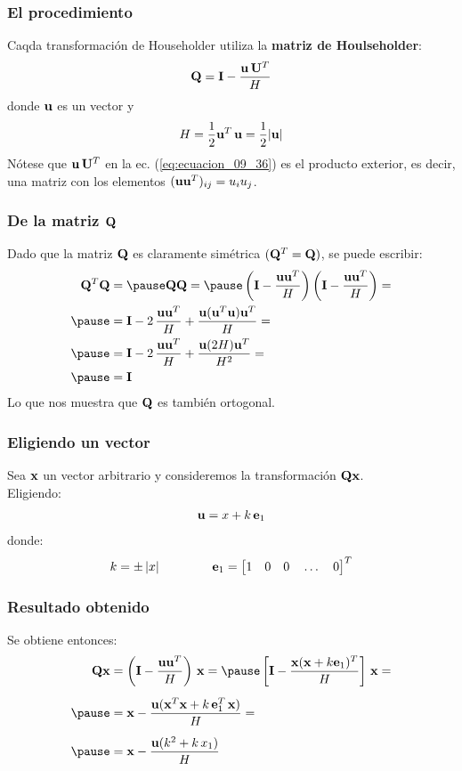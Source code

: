 \documentclass[12pt]{beamer}
\begin{document}
\begin{frame}
\frametitle{El procedimiento}
Caqda transformación de Householder utiliza la \textbf{\textcolor{drab}{matriz de Houlseholder}}:
\pause
\begin{align}
\vb{Q} = \vb{I} - \dfrac{\vb{u} \, \vb{U}^{T}}{H}
\label{eq:ecuacion_09_36}
\end{align}
\pause
donde 
$\vb{u}$ es un vector y 
\begin{align}
H = \dfrac{1}{2} \vb{u}^{T} \, \vb{u} = \dfrac{1}{2} \abs{\vb{u}}
\label{eq:ecuacion_09_37}
\end{align}
\pause
Nótese que $\vb{u} \, \vb{U}^{T}$ en la ec. (\ref{eq:ecuacion_09_36}) es el producto exterior, es decir, una matriz con los elementos $(\vb{u} \vb{u}^{T})_{ij} = u_{i} u_{j}$.
\end{frame}
\begin{frame}
\frametitle{De la matriz $\vb{Q}$}
Dado que la matriz $\vb{Q}$ es claramente simétrica $(\vb{Q}^{T} = \vb{Q})$, se puede escribir:
\pause
\begin{eqnarray*}
\begin{aligned}
\vb{Q}^{T} \vb{Q} &= \pause \vb{Q Q} = \pause \left( \vb{I} - \dfrac{\vb{u} \vb{u}^{T}}{H} \right) \left( \vb{I} - \dfrac{\vb{u} \vb{u}^{T}}{H} \right) = \\ \pause
&= \vb{I} - 2 \, \dfrac{\vb{u} \vb{u}^{T}}{H} + \dfrac{\vb{u} (\vb{u}^{T} \vb{u}) \vb{u}^{T}}{H} = \\ \pause
&= \vb{I} - 2 \, \dfrac{\vb{u} \vb{u}^{T}}{H} + \dfrac{\vb{u} (2 H) \vb{u}^{T}}{H^{2}} = \\ \pause
&= \vb{I}
\end{aligned}
\end{eqnarray*}
Lo que nos muestra que $\vb{Q}$ es también ortogonal.
\end{frame}
\begin{frame}
\frametitle{Eligiendo un vector}
Sea $\vb{x}$ un vector arbitrario y consideremos la transformación $\vb{Q x}$.
\\
\bigskip
\pause
Eligiendo:
\pause
\begin{align}
\vb{u} = x + k \, \vb{e}_{1}
\label{eq:ecuacion_09_38}
\end{align}
\pause
donde:
\begin{align*}
k = \pm \, \abs{x} \hspace{1.5cm} \vb{e}_{1} = \big[ 1 \quad 0 \quad 0 \quad \ldots \quad 0 \big]^{T}
\end{align*}
\end{frame}
\begin{frame}
\frametitle{Resultado obtenido}
Se obtiene entonces:
\pause
\begin{eqnarray*}
\begin{aligned}
\vb{Q x} &= \left( \vb{I} - \dfrac{\vb{u} \vb{u}^{T}}{H} \right) \, \vb{x} = \pause \left[ \vb{I} - \dfrac{\vb{x} (\vb{x} + k \vb{e}_{1})^{T}}{H} \right] \, \vb{x} = \\[0.5em] \pause
&= \vb{x} - \dfrac{\vb{u} (\vb{x}^{T} \vb{x} + k \, \vb{e}_{1}^{T} \, \vb{x})}{H} = \\[0.5em] \pause
&= \vb{x} - \dfrac{\vb{u} (k^{2} + k \,x_{1})}{H}
\end{aligned}
\end{eqnarray*}
\end{frame}
\end{document}
